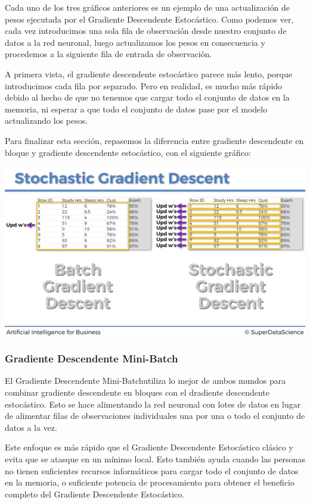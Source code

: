 \documentclass[
]{book}
\begin{document}
Cada uno de los tres gráficos anteriores es un ejemplo de una actualización de pesos ejecutada por el Gradiente Descendente Estocástico. Como podemos ver, cada vez introducimos una sola fila de observación desde nuestro conjunto de datos a la red neuronal, luego actualizamos los pesos en consecuencia y procedemos a la siguiente fila de entrada de observación.

A primera vista, el gradiente descendente estocástico parece más lento, porque introducimos cada fila por separado. Pero en realidad, es mucho más rápido debido al hecho de que no tenemos que cargar todo el conjunto de datos en la memoria, ni esperar a que todo el conjunto de datos pase por el modelo actualizando los pesos.

Para finalizar esta sección, repasemos la diferencia entre gradiente descendente en bloque y gradiente descendente estocástico, con el siguiente gráfico:

\includegraphics{Images/ANN_31.png}

\hypertarget{gradiente-descendente-mini-batch}{%
\subsubsection{Gradiente Descendente Mini-Batch}\label{gradiente-descendente-mini-batch}}

El Gradiente Descendente Mini-Batchutiliza lo mejor de ambos mundos para combinar gradiente descendente en bloques con el dradiente descendente estocástico. Esto se hace alimentando la red neuronal con lotes de datos en lugar de alimentar filas de observaciones individuales una por una o todo el conjunto de datos a la vez.

Este enfoque es más rápido que el Gradiente Descendente Estocástico clásico y evita que se atasque en un mínimo local. Esto también ayuda cuando las personas no tienen suficientes recursos informáticos para cargar todo el conjunto de datos en la memoria, o suficiente potencia de procesamiento para obtener el beneficio completo del Gradiente Descendente Estocástico.
\end{document}
